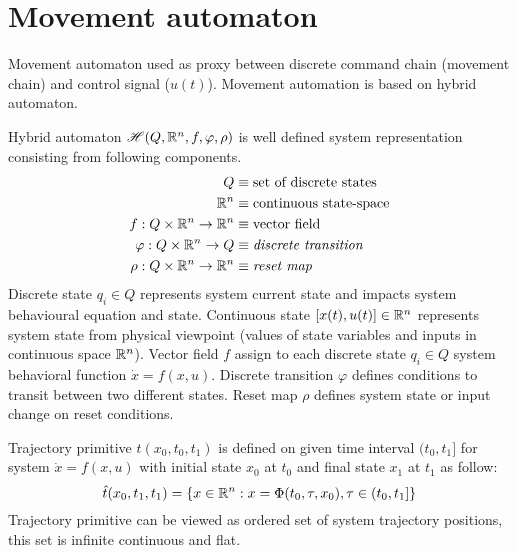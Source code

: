 \section{Movement automaton}\label{sec:movement automaton}
\noindent Movement automaton used as proxy between discrete command chain (movement chain) and control signal ($u(t)$). Movement automation is based on hybrid automaton.
\begin{definition} {Hybrid automaton $\mathscr{H}(Q,\mathbb{R}^n,f,\varphi,\rho)$} is well defined system representation consisting from following components.
\begin{equation}
    \begin{aligned}
        Q &\equiv \textnormal{set of discrete states}\\
        \mathbb{R}^n &\equiv \textnormal{continuous state-space} \\
        f: Q\times \mathbb{R}^n \to \mathbb{R}^n & \equiv \textnormal{vector field}\\
        \varphi:Q\times \mathbb{R}^n \to Q & \equiv \textit{discrete transition}\\
        \rho : Q\times \mathbb{R}^n \to \mathbb{R}^n & \equiv\textit{reset map}\\
    \end{aligned}
\end{equation}
Discrete state $q_i \in Q$ represents system current state and impacts system behavioural equation and state. Continuous state $[x(t),u(t)]\in \mathbb{R}^n$ represents  system state from physical viewpoint (values of state variables and inputs in continuous space $\mathbb{R}^n$). Vector field $f$ assign to each discrete state $q_i \in Q$ system behavioral function $\dot{x} = f(x,u)$. Discrete transition $\varphi$ defines conditions to transit between two different states. Reset map $\rho$ defines system state or input change on reset conditions.
\end{definition} 

\begin{definition}{Trajectory primitive $\hat{t}(x_0,t_0,t_1)$} is defined on given time interval $(t_0,t_1]$ for system $\dot{x} = f(x,u)$ with initial state $x_0$ at $t_0$ and final state $x_1$ at $t_1$ as follow:
\begin{equation}
    \hat{t}(x_0,t_1,t_1) = \left\{ x\in\mathbb{R}^n: x = \Phi(t_0,\tau,x_0), \tau \in (t_0,t_1] \right\}
\end{equation}
Trajectory primitive can be viewed as ordered set of system trajectory positions, this set is infinite continuous and flat.    
\end{definition}

